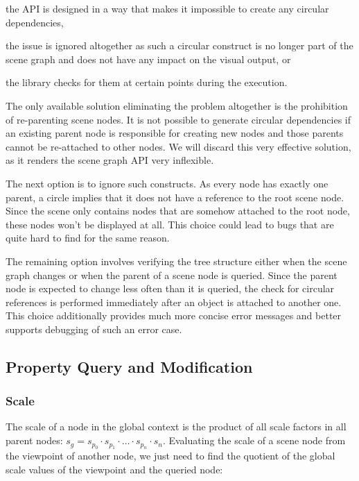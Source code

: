 		\begin{smalllist}
			\item the API is designed in a way that makes it impossible to create any circular dependencies,
			\item the issue is ignored altogether as such a circular construct is no longer part of the scene graph and does not have any impact on the visual output, or
			\item the library checks for them at certain points during the execution.
		\end{smalllist}

		The only available solution eliminating the problem altogether is the prohibition of re-parenting scene nodes. It is not possible to generate circular dependencies if an existing parent node is responsible for creating new nodes and those parents cannot be re-attached to other nodes. We will discard this very effective solution, as it renders the scene graph API very inflexible.

		The next option is to ignore such constructs. As every node has exactly one parent, a circle implies that it does not have a reference to the root scene node. Since the scene only contains nodes that are somehow attached to the root node, these nodes won't be displayed at all. This choice could lead to bugs that are quite hard to find for the same reason.

		The remaining option involves verifying the tree structure either when the scene graph changes or when the parent of a scene node is queried. Since the parent node is expected to change less often than it is queried, the check for circular references is performed immediately after an object is attached to another one. This choice additionally provides much more concise error messages and better supports debugging of such an error case.

	\subsection{Property Query and Modification}

		\subsubsection{Scale}

			The scale of a node in the global context is the product of all scale factors in all parent nodes: $s_g = s_{p_0} \cdot s_{p_1} \cdot \ldots \cdot s_{p_n} \cdot s_n$. Evaluating the scale of a scene node from the viewpoint of another node, we just need to find the quotient of the global scale values of the viewpoint and the queried node:

